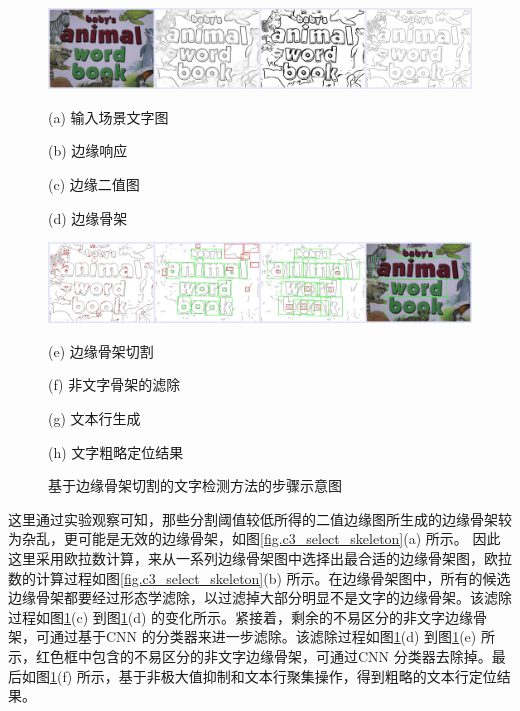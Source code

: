     \begin{figure}[!h]
    \centering
    \includegraphics[width=\textwidth]{./figures/c3_overview_1.jpg}
    \begin{minipage}[t]{0.22\linewidth}
    \centerline{ \small (a) 输入场景文字图}
    \end{minipage}
    \begin{minipage}[t]{0.22\linewidth}
    \centerline{ \small (b) 边缘响应}
    \end{minipage}
    \begin{minipage}[t]{0.22\linewidth}
    \centerline{ \small (c) 边缘二值图}
    \end{minipage}
    \begin{minipage}[t]{0.22\linewidth}
    \centerline{ \small (d) 边缘骨架}
    \end{minipage}
    \includegraphics[width=\textwidth]{./figures/c3_overview_2.jpg}
    \begin{minipage}[t]{0.22\linewidth}
    \centerline{ \small (e) 边缘骨架切割}
    \end{minipage}
    \begin{minipage}[t]{0.22\linewidth}
    \centerline{ \small (f) 非文字骨架的滤除}
    \end{minipage}
    \begin{minipage}[t]{0.22\linewidth}
    \centerline{ \small (g) 文本行生成}
    \end{minipage}
    \begin{minipage}[t]{0.22\linewidth}
    \centerline{ \small (h) 文字粗略定位结果}
    \end{minipage}
    \caption{基于边缘骨架切割的文字检测方法的步骤示意图}
    \label{fig.c3_overview}
    \end{figure}

    这里通过实验观察可知，那些分割阈值较低所得的二值边缘图所生成的边缘骨架较为杂乱，更可能是无效的边缘骨架，如图\ref{fig.c3_select_skeleton}(a) 所示。
    因此这里采用欧拉数计算，来从一系列边缘骨架图中选择出最合适的边缘骨架图，欧拉数的计算过程如图\ref{fig.c3_select_skeleton}(b) 所示。在边缘骨架图中，所有的候选边缘骨架都要经过形态学滤除，以过滤掉大部分明显不是文字的边缘骨架。该滤除过程如图\ref{fig.c3_overview}(c) 到图\ref{fig.c3_overview}(d) 的变化所示。紧接着，剩余的不易区分的非文字边缘骨架，可通过基于CNN 的分类器来进一步滤除。该滤除过程如图\ref{fig.c3_overview}(d) 到图\ref{fig.c3_overview}(e) 所示，红色框中包含的不易区分的非文字边缘骨架，可通过CNN 分类器去除掉。最后如图\ref{fig.c3_overview}(f) 所示，基于非极大值抑制和文本行聚集操作，得到粗略的文本行定位结果。


